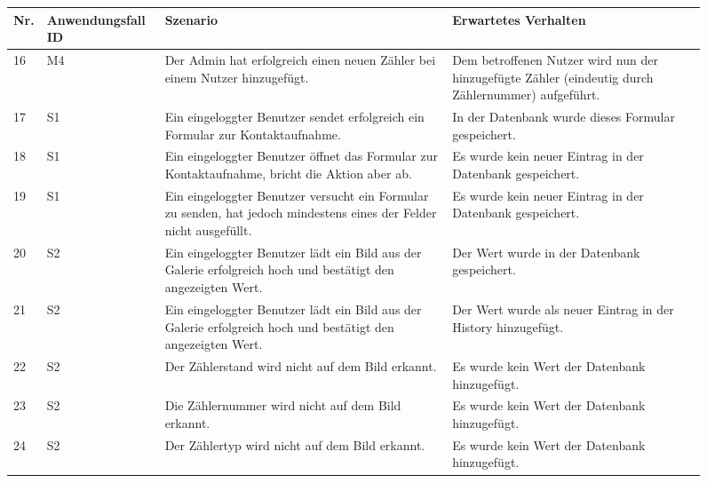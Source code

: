 	\begin{figure}[!h]
		\begin{center}
			\begin{tabularx}{\textwidth}{ p{} | p{} | p{} | X }
				\textbf{Nr.} & \textbf{Anwendungsfall ID} & \textbf{Szenario} & \textbf{Erwartetes Verhalten} \\ \hline
				16 & M4 & Der Admin hat erfolgreich einen neuen Zähler bei einem Nutzer hinzugefügt.   & Dem betroffenen Nutzer wird nun der hinzugefügte Zähler (eindeutig durch Zählernummer) aufgeführt. \\ \hline
				17 & S1 & Ein eingeloggter Benutzer sendet erfolgreich ein Formular zur Kontaktaufnahme. & In der Datenbank wurde dieses Formular gespeichert. \\ \hline
                			18 & S1 & Ein eingeloggter Benutzer öffnet das Formular zur Kontaktaufnahme, bricht die Aktion aber ab. & Es wurde kein neuer Eintrag in der Datenbank gespeichert. \\ \hline
                			19 & S1 & Ein eingeloggter Benutzer versucht ein Formular zu senden, hat jedoch mindestens eines der Felder nicht ausgefüllt. &  Es wurde kein neuer Eintrag in der Datenbank gespeichert. \\ \hline
                			20 & S2 & Ein eingeloggter Benutzer lädt ein Bild aus der Galerie erfolgreich hoch und bestätigt den angezeigten Wert. & Der Wert wurde in der Datenbank gespeichert.    \\ \hline
                			21 & S2 & Ein eingeloggter Benutzer lädt ein Bild aus der Galerie erfolgreich hoch und bestätigt den angezeigten Wert. & Der Wert wurde als neuer Eintrag in der History hinzugefügt.    \\ \hline
                			22 & S2 & Der Zählerstand wird nicht auf dem Bild erkannt. & Es wurde kein Wert der Datenbank hinzugefügt. \\ \hline
                			23 & S2 & Die Zählernummer wird nicht auf dem Bild erkannt. & Es wurde kein Wert der Datenbank hinzugefügt. \\ \hline
                			24 & S2 & Der Zählertyp wird nicht auf dem Bild erkannt. & Es wurde kein Wert der Datenbank hinzugefügt. \\ \hline
			\end{tabularx}	
		\end{center}
		\end{figure}
                			
